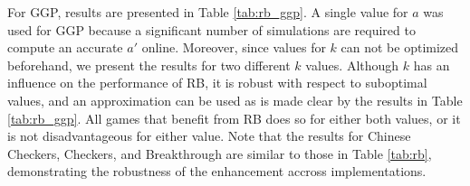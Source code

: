 \documentclass{ecai2014}
\begin{document}
\begin{table}
{\caption{Relative Bonus in GGP, {}, $a = 0.25$  sec. startclock, 15 sec. playclock} \label{tab:rb_ggp}}
\centering
\tabcolsep=0.25cm
\end{table}

For GGP, results are presented in Table \ref{tab:rb_ggp}. A single value for $a$ was used for GGP because a significant number of simulations are required to compute an accurate $a'$ online. Moreover, since values for $k$ can not be optimized beforehand, we present the results for two different $k$ values. Although $k$ has an influence on the performance of RB, it is robust with respect to suboptimal values, and an approximation can be used as is made clear by the results in Table \ref{tab:rb_ggp}. All games that benefit from RB does so for either both values, or it is not disadvantageous for either value. Note that the results for Chinese Checkers, Checkers, and Breakthrough are similar to those in Table \ref{tab:rb}, demonstrating the robustness of the enhancement accross implementations.
\end{document}
